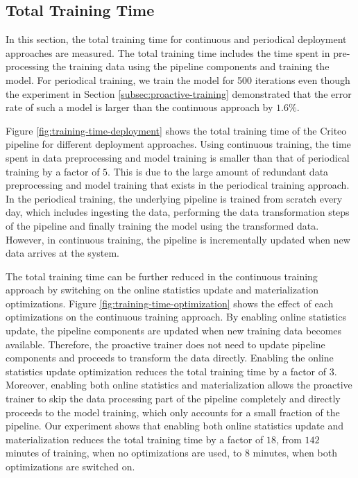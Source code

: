 \subsection{Total Training Time}
In this section, the total training time for continuous and periodical deployment approaches are measured.
The total training time includes the time spent in pre-processing the training data using the pipeline components and training the model.
For periodical training, we train the model for 500 iterations even though the experiment in Section \ref{subsec:proactive-training} demonstrated that the error rate of such a model is larger than the continuous approach by $1.6\%$.

Figure \ref{fig:training-time-deployment} shows the total training time of the Criteo pipeline for different deployment approaches.
Using continuous training, the time spent in data preprocessing and model training is smaller than that of periodical training by a factor of $5$.
This is due to the large amount of redundant data preprocessing and model training that exists in the periodical training approach.
In the periodical training, the underlying pipeline is trained from scratch every day, which includes ingesting the data, performing the data transformation steps of the pipeline and finally training the model using the transformed data.
However, in continuous training, the pipeline is incrementally updated when new data arrives at the system.

The total training time can be further reduced in the continuous training approach by switching on the online statistics update and materialization optimizations.
Figure \ref{fig:training-time-optimization} shows the effect of each optimizations on the continuous training approach.
By enabling online statistics update, the pipeline components are updated when new training data becomes available.
Therefore, the proactive trainer does not need to update pipeline components and proceeds to transform the data directly.
Enabling the online statistics update optimization reduces the total training time by a factor of $3$.
Moreover, enabling both online statistics and materialization allows the proactive trainer to skip the data processing part of the pipeline completely and directly proceeds to the model training, which only accounts for a small fraction of the pipeline.
Our experiment shows that enabling both online statistics update and materialization reduces the total training time by a factor of $18$, from $142$ minutes of training, when no optimizations are used, to $8$ minutes, when both optimizations are switched on.

